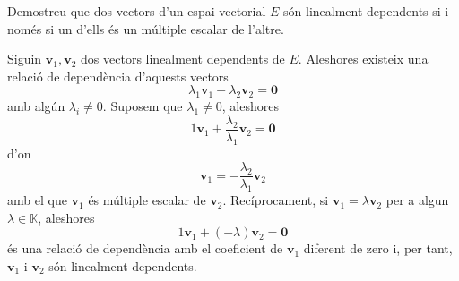 \begin{exemple}
Demostreu que dos vectors d’un espai vectorial $E$ són
linealment dependents si i només si un d'ells és un múltiple escalar
de l'altre.

\end{exemple}
\begin{solucio}
Siguin $\mathbf{v}_{1},\mathbf{v}_{2}$ dos vectors linealment dependents de $%
E$. Aleshores existeix una relació de dependència d'aquests
vectors%
\begin{equation*}
\lambda _{1}\mathbf{v}_{1}+\lambda _{2}\mathbf{v}_{2}=\mathbf{0}
\end{equation*}%
amb algún $\lambda _{i}\neq 0$. Suposem que $\lambda _{1}\neq 0$,
aleshores%
\begin{equation*}
1\mathbf{v}_{1}+\frac{\lambda _{2}}{\lambda _{1}}\mathbf{v}_{2}=\mathbf{0}
\end{equation*}%
d’on%
\begin{equation*}
\mathbf{v}_{1}=-\frac{\lambda _{2}}{\lambda _{1}}\mathbf{v}_{2}
\end{equation*}%
amb el que $\mathbf{v}_{1}$ és múltiple escalar de $\mathbf{v}_{2}$.
Recíprocament, si $\mathbf{v}_{1}=\lambda \mathbf{v}_{2}$ per a algun $%
\lambda \in \mathbb{K}$, aleshores%
\begin{equation*}
1\mathbf{v}_{1}+(-\lambda )\mathbf{v}_{2}=\mathbf{0}
\end{equation*}%
és una relació de dependència amb el coeficient de $\mathbf{v}_{1}$ diferent
de zero i, per tant, $\mathbf{v}_{1}$ i $\mathbf{v}_{2}$ són linealment
dependents.
\end{solucio}

